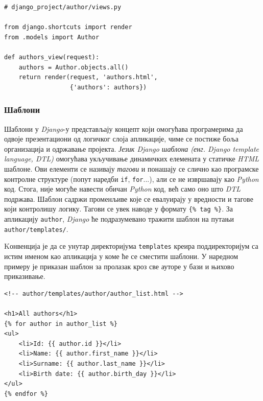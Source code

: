 \documentclass[12pt,oneside]{memoir}
\begin{document}
\begin{lstlisting}
# django_project/author/views.py

from django.shortcuts import render
from .models import Author

def authors_view(request):
    authors = Author.objects.all()
    return render(request, 'authors.html', 
                  {'authors': authors})
\end{lstlisting}

\subsubsection{Шаблони}

Шаблони у \textit{Django}-у представљају концепт који омогућава програмерима да одвоје презентациони од логичког слоја апликације, чиме се постиже боља организација и одржавање пројекта. \textit{Језик Django шаблона (енг. Django template language, DTL)} \cite{django_doc_dtl} омогућава укључивање динамичких елемената у статичке \textit{HTML} шаблоне. Ови елементи се називају \textit{тагови} и понашају се слично као програмске контролне структуре (попут наредби \texttt{if}, \texttt{for}...), али се не извршавају као \textit{Python} код. Стога, није могуће навести обичан \textit{Python} код, већ само оно што \textit{DTL} подржава. Шаблон садржи променљиве које се евалуирају у вредности и тагове који контролишу логику. Тагови се увек наводе у формату \texttt{\{\% tag \%\}}. За апликацију \texttt{author}, \textit{Django} ће подразумевано тражити шаблон на путањи \texttt{author/templates/}. 

Kонвенција је да се унутар директоријума \texttt{templates} креира поддиректоријум са истим именом као апликација у коме ће се сместити шаблони. У наредном примеру је приказан шаблон за пролазак кроз све ауторе у бази и њихово приказивање.

\begin{lstlisting}
<!-- author/templates/author/author_list.html -->

<h1>All authors</h1>
{% for author in author_list %}
<ul>
    <li>Id: {{ author.id }}</li>
    <li>Name: {{ author.first_name }}</li>
    <li>Surname: {{ author.last_name }}</li>
    <li>Birth date: {{ author.birth_day }}</li>
</ul>
{% endfor %}
\end{lstlisting}
\end{document}
